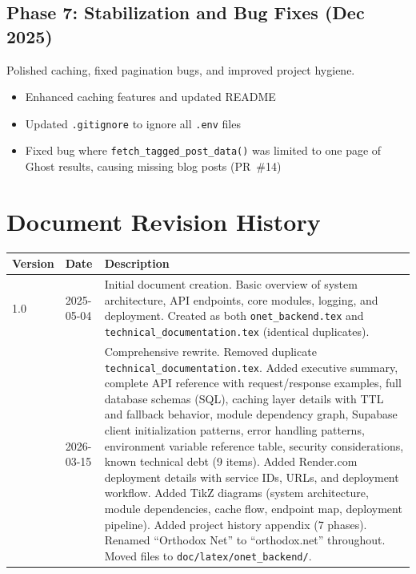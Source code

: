 \documentclass[12pt]{article}
\begin{document}
\subsection{Phase 7: Stabilization and Bug Fixes (Dec 2025)}

Polished caching, fixed pagination bugs, and improved project hygiene.

\begin{itemize}
    \item Enhanced caching features and updated README
    \item Updated \texttt{.gitignore} to ignore all \texttt{.env} files
    \item Fixed bug where \texttt{fetch\_tagged\_post\_data()} was limited to one page of Ghost results, causing missing blog posts (PR~\#14)
\end{itemize}

\clearpage
\section{Document Revision History}
\label{sec:revisions}

\begin{longtable}{llp{9.5cm}}
\toprule
\textbf{Version} & \textbf{Date} & \textbf{Description} \\
\midrule
\endhead
1.0 & 2025-05-04 & Initial document creation. Basic overview of system architecture, API endpoints, core modules, logging, and deployment. Created as both \texttt{onet\_backend.tex} and \texttt{technical\_documentation.tex} (identical duplicates). \\
\addlinespace
2.0 & 2026-03-15 & Comprehensive rewrite. Removed duplicate \texttt{technical\_documentation.tex}. Added executive summary, complete API reference with request/response examples, full database schemas (SQL), caching layer details with TTL and fallback behavior, module dependency graph, Supabase client initialization patterns, error handling patterns, environment variable reference table, security considerations, known technical debt (9 items). Added Render.com deployment details with service IDs, URLs, and deployment workflow. Added TikZ diagrams (system architecture, module dependencies, cache flow, endpoint map, deployment pipeline). Added project history appendix (7 phases). Renamed ``Orthodox Net'' to ``orthodox.net'' throughout. Moved files to \texttt{doc/latex/onet\_backend/}. \\
\bottomrule
\end{longtable}
\end{document}
